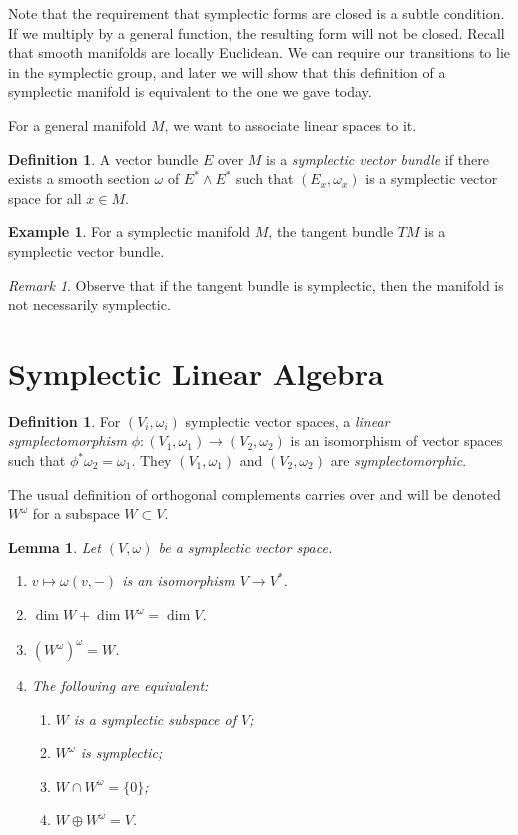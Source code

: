 \documentclass[leqno, openany]{memoir}
\newtheorem{lem}[thm]{Lemma}
\theoremstyle{definition}
\newtheorem{defn}[thm]{Definition}
\newtheorem{exm}[thm]{Example}
\theoremstyle{remark}
\newtheorem{rmk}[thm]{Remark}
\theoremstyle{plain}
\theoremstyle{definition}
\theoremstyle{remark}
\begin{document}
Note that the requirement that symplectic forms are closed is a subtle
condition. If we multiply by a general function, the resulting form will not be
closed. Recall that smooth manifolds are locally Euclidean. We can require our
transitions to lie in the symplectic group, and later we will show that this
definition of a symplectic manifold is equivalent to the one we gave today.

For a general manifold $M$, we want to associate linear spaces to it. 

\begin{defn} A vector bundle $E$ over $M$ is a \textit{symplectic vector
bundle} if there exists a smooth section $\omega$ of $E^* \wedge E^*$ such that
$(E_x, \omega_x)$ is a symplectic vector space for all $x \in M$.  \end{defn}

\begin{exm} For a symplectic manifold $M$, the tangent bundle $TM$ is a
symplectic vector bundle.  \end{exm}

\begin{rmk} Observe that if the tangent bundle is symplectic, then the manifold
is not necessarily symplectic.  \end{rmk}

\section{Symplectic Linear Algebra}%

\begin{defn} For $(V_i, \omega_i)$ symplectic vector spaces, a \textit{linear
    symplectomorphism} $\phi: (V_1, \omega_1) \to (V_2, \omega_2)$ is an
    isomorphism of vector spaces such that $\phi^* \omega_2 = \omega_1$. They
    $(V_1, \omega_1)$ and $(V_2, \omega_2)$ are \textit{symplectomorphic}.
\end{defn}

The usual definition of orthogonal complements carries over and will be denoted
$W^{\omega}$ for a subspace $W \subset V$.

\begin{lem} Let $(V, \omega)$ be a symplectic vector space.  \begin{enumerate}
    \item $v \mapsto \omega(v,-)$ is an isomorphism $V \to V^*$.  \item $\dim W
        + \dim W^{\omega} = \dim V$.  \item ${ (W^{\omega}) }^{\omega} = W$.
    \item The following are equivalent: \begin{enumerate} \item $W$ is a
    symplectic subspace of $V$; \item $W^{\omega}$ is symplectic; \item $W \cap
    W^{\omega} = \{0\}$; \item $W \oplus W^{\omega} = V$.  \end{enumerate}
    \end{enumerate} \end{lem}
\end{document}

